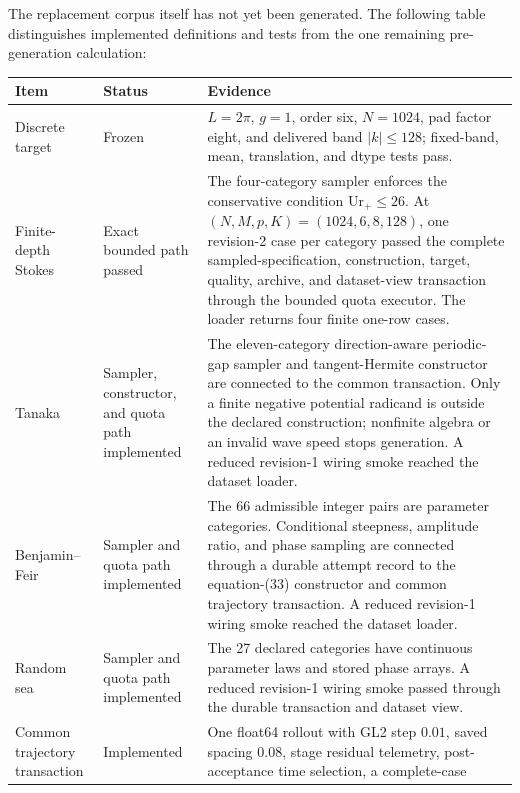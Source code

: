 \documentclass[11pt]{article}
\begin{document}
The replacement corpus itself has not yet been generated.  The following
table distinguishes implemented definitions and tests from the one remaining
pre-generation calculation:
\begin{center}
\small
\begin{tabularx}{\textwidth}{
  @{}>{\raggedright\arraybackslash}p{}
     >{\raggedright\arraybackslash}p{}
     >{\raggedright\arraybackslash}X@{}}
  \toprule
  Item & Status & Evidence \\
  \midrule
  Discrete target
    & Frozen
    & $L=2\pi$, $g=1$, order six, $N=1024$, pad factor eight, and delivered band
      $|k|\leq128$; fixed-band, mean, translation, and dtype tests pass. \\
  Finite-depth Stokes
    & Exact bounded path passed
    & The four-category sampler enforces the conservative condition
      $\mathrm{Ur}_+\leq26$.  At
      $(N,M,p,K)=(1024,6,8,128)$, one revision-2 case per category passed
      the complete sampled-specification, construction, target, quality,
      archive, and dataset-view transaction through the bounded quota
      executor.  The loader returns four finite one-row cases. \\
  Tanaka
    & Sampler, constructor, and quota path implemented
    & The eleven-category direction-aware periodic-gap sampler and
      tangent-Hermite constructor are
      connected to the common transaction.  Only a finite negative potential
      radicand is outside the declared construction; nonfinite algebra or an
      invalid wave speed stops generation.  A reduced revision-1 wiring smoke
      reached the dataset loader. \\
  Benjamin--Feir
    & Sampler and quota path implemented
    & The 66 admissible integer pairs are parameter categories.  Conditional
      steepness, amplitude ratio, and phase sampling are connected through a
      durable attempt record to the equation-(33) constructor and common
      trajectory transaction.  A reduced revision-1 wiring smoke reached the
      dataset loader. \\
  Random sea
    & Sampler and quota path implemented
    & The 27 declared categories have continuous parameter laws and stored
      phase arrays.  A reduced revision-1 wiring smoke passed through the
      durable transaction and dataset view. \\
  Common trajectory transaction
    & Implemented
    & One float64 rollout with GL2 step $0.01$, saved spacing $0.08$, stage
      residual telemetry, post-acceptance time selection, a complete-case

\end{tabularx}
\end{center}
\end{document}

